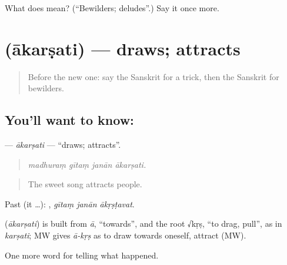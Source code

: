 \begin{tcolorbox}[breakable,colback=teal!4,colframe=teal!35!black,title={Before you move on}]
What does  mean? (\textquotedblleft{}Bewilders; deludes\textquotedblright{}.) Say it once more.
\end{tcolorbox}
\section[\texorpdfstring{\sk{आकर्षति} (ākarṣati)}{आकर्षति (ākarṣati)}]{ (ākarṣati) — draws; attracts}

\label{lesson:SA-C335-akarsati}



\begin{quote}
Before the new one: say the Sanskrit for a trick, then the Sanskrit for bewilders.
\end{quote}

\subsection*{You'll want to know: }
\textbf{} — \emph{ākarṣati} — \textquotedblleft{}draws; attracts\textquotedblright{}.

\begin{quote}
   
\end{quote}

\begin{quote}
\emph{madhuraṃ gītaṃ janān ākarṣati.}
\end{quote}

\begin{quote}
The sweet song attracts people.
\end{quote}

Past (it …):   , \emph{gītaṃ janān ākṛṣṭavat}.

\begin{cousinweb}
\textbf{} (\emph{ākarṣati}) is built from \emph{ā}, \textquotedblleft{}towards\textquotedblright{}, and the root √kṛṣ, \textquotedblleft{}to drag, pull\textquotedblright{}, as in \emph{karṣati}; MW gives \emph{ā-kṛṣ} as to draw towards oneself, attract (MW).
\end{cousinweb}

\begin{grammarlens}[title={What you've built}]
One more word for telling what happened.
\end{grammarlens}

